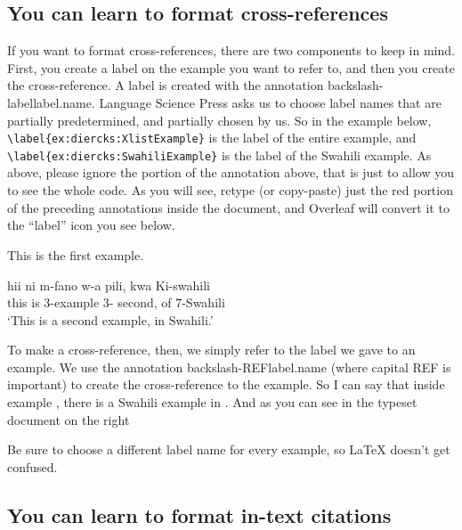 \documentclass[output=paper,colorlinks,citecolor=brown,
]{langscibook}
\begin{document}
\subsection{You can learn to format cross-references}

If you want to format cross-references, there are two components to keep in mind. First, you create a label on the example you want to refer to, and then you create the cross-reference. A label is created with the annotation backslash-label{label.name}. Language Science Press asks us to choose label names that are partially predetermined, and partially chosen by us. So in the example below, \verb|\label{ex:diercks:XlistExample}| is the label of the entire example, and \verb|\label{ex:diercks:SwahiliExample}| is the label of the Swahili example.  As above, please ignore the \verb|| portion of the annotation above, that is just to allow you to see the whole code.  As you will see,  retype (or copy-paste) just the red portion of the preceding annotations inside the document, and Overleaf will convert it to the ``label'' icon you see below. 

\ea \label{ex:diercks:XlistExample}
\begin{xlist}

\ex This is the first example. 

\ex \label{ex:diercks:SwahiliExample}
\gll hii ni m-fano w-a pili, kwa Ki-swahili \\
this is 3-example 3-\Assoc{} second, of 7-Swahili \\
\glt `This is a second example, in Swahili.' 

\end{xlist}

\z 

To make a cross-reference, then, we simply refer to the label we gave to an example. We use the annotation backslash-REF{label.name} (where capital REF is important) to create the cross-reference to the example. So I can say that inside example , there is a Swahili example in . And as you can see in the typeset document on the right

Be sure to choose a different label name for every example, so LaTeX doesn't get confused.

\subsection{You can learn to format in-text citations}
\end{document}

